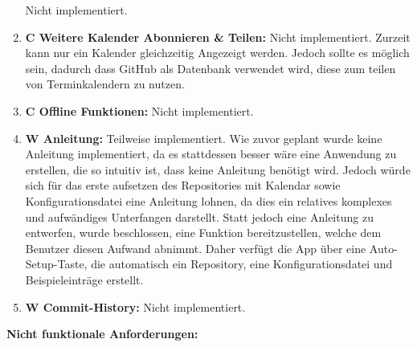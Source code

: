 \begin{enumerate}
		Nicht implementiert.%
	\item \textbf{C Weitere Kalender Abonnieren \& Teilen:} %
		Nicht implementiert. Zurzeit kann nur ein Kalender gleichzeitig Angezeigt werden. %
		Jedoch sollte es möglich sein, dadurch dass GitHub als Datenbank verwendet wird, diese zum teilen von Terminkalendern zu nutzen.%
	\item \textbf{C Offline Funktionen:} %
		Nicht implementiert.%
	\item \textbf{W Anleitung:} %
		Teilweise implementiert. Wie zuvor geplant wurde keine Anleitung implementiert, da es stattdessen besser wäre eine Anwendung zu erstellen, die so intuitiv ist, dass keine Anleitung benötigt wird. %
		Jedoch würde sich für das erste aufsetzen des Repositories mit Kalendar sowie Konfigurationsdatei eine Anleitung lohnen, da dies ein relatives komplexes und aufwändiges Unterfangen darstellt. Statt jedoch eine Anleitung zu entwerfen, wurde beschlossen, eine Funktion bereitzustellen, welche dem Benutzer diesen Aufwand abnimmt. Daher verfügt die App über eine Auto-Setup-Taste, die automatisch ein Repository, eine Konfigurationsdatei und Beispieleinträge erstellt.%
	\item \textbf{W Commit-History:}
		Nicht implementiert.%
\end{enumerate}%
%
\myNewSection
\textbf{Nicht funktionale Anforderungen:}
